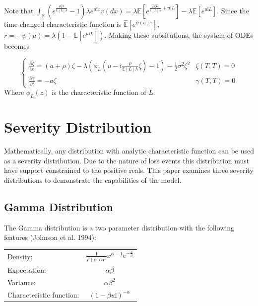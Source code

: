 \documentclass{article}
\theoremstyle{definition}
\begin{document}
Note that \(\int_{\mathbb{R}} \left(e^{\frac{\rho \zeta x}{\mathbb{E}[L] \lambda}}-1\right)\lambda e^{u\mathrm{i}x} v(dx) = \lambda \mathbb{E}\left[ e^{ \frac{\rho \zeta L }{\mathbb{E}[L] \lambda}+u\mathrm{i} L}\right] - \lambda \mathbb{E}\left[ e^{u\mathrm{i} L} \right] \).  Since the time-changed characteristic function is \(\mathbb{\hat{E}}\left[e^{\psi(u)\tau} \right] \),  \(r=-\psi(u)=\lambda(1-\mathbb{E}[e^{u\mathrm{i}L}])\).  Making these subsitutions, the system of ODEs becomes

\begin{equation}\label{ode}
\begin{cases}
\frac{\partial \zeta}{\partial t}=(a+\rho) \zeta-\lambda\left(\phi_L(u-\mathrm{i}\frac{\rho}{\mathbb{E}[L] \lambda} \zeta )-1\right)-\frac{1}{2} \sigma^2 \zeta^2 & \zeta(T, T)=0\\
\frac{\partial \gamma}{\partial t}=-a \zeta & \gamma(T, T)=0
\end{cases} \end{equation}
Where \(\phi_L(z)\) is the characteristic function of \(L\).

\section{Severity Distribution}
Mathematically, any distribution with analytic characteristic function can be used as a severity distribution.  Due to the nature of loss events this distribution must have support constrained to the positive reals. This paper examines three severity distributions to demonstrate the capabilities of the model.

\subsection{Gamma Distribution}

The Gamma distribution is a two parameter distribution with the following features (Johnson et al. 1994):

\begin{center}
\begin{tabular}{lc}
Density: & \(\frac{1}{\Gamma(\alpha)\alpha^\beta}x^{\alpha-1} e^{-\frac{x}{\beta}}\)\\
Expectation: & \(\alpha \beta\) \\
Variance: & \(\alpha \beta^2\) \\
Characteristic function: & \((1-\beta u\mathrm{i})^{-\alpha} \)
\end{tabular}
\end{center}
\end{document}
